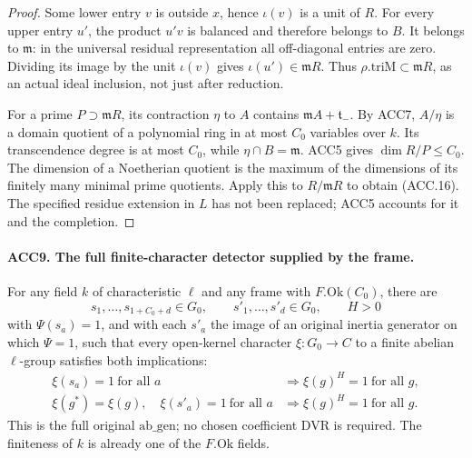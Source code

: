 \begin{proof}
Some lower entry \(v\) is outside \(x\), hence \(\iota(v)\)
is a unit of \(R\).  For every upper entry \(u'\), the product
\(u'v\) is balanced and therefore belongs to \(B\).  It belongs
to \(\mathfrak m\): in the universal residual representation
all off-diagonal entries are zero.  Dividing its image by the unit
\(\iota(v)\) gives \(\iota(u')\in\mathfrak mR\).
Thus \(\rho.\mathrm{triM}\subset\mathfrak mR\), as an actual
ideal inclusion, not just after reduction.

For a prime \(P\supset\mathfrak mR\), its contraction
\(\eta\) to \(A\) contains \(\mathfrak mA+\mathfrak t_-\).
By ACC7, \(A/\eta\) is a domain quotient of a polynomial ring
in at most \(C_0\) variables over \(k\).  Its transcendence
degree is at most \(C_0\), while \(\eta\cap B=\mathfrak m\).
ACC5 gives \(\dim R/P\le C_0\).  The dimension of a Noetherian
quotient is the maximum of the dimensions of its finitely many
minimal prime quotients.  Apply this to \(R/\mathfrak mR\)
to obtain (ACC.16).  The specified residue extension in \(L\)
has not been replaced; ACC5 accounts for it and the completion.
\end{proof}

\paragraph{ACC9. The full finite-character detector supplied by the frame.}
\label{claim:ACC9}
For any field \(k\) of characteristic \(\ell\) and any frame
with \(F.\mathrm{Ok}(C_0)\), there are
\[
 s_1,\ldots,s_{1+C_0+d}\in G_0,\qquad
 s'_1,\ldots,s'_d\in G_0,\qquad H>0                       \tag{ACC.17}
\]
with \(\Psi(s_a)=1\), and with each \(s'_a\) the image of
an original inertia generator on which \(\Psi=1\), such that
every open-kernel character \(\xi:G_0\to C\) to a finite
abelian \(\ell\)-group satisfies both implications:
\[
 \begin{split}
 \xi(s_a)=1\ \text{for all }a
       &\Longrightarrow \xi(g)^H=1\ \text{for all }g,\\
 \xi(g^*)=\xi(g),\quad \xi(s'_a)=1\ \text{for all }a
       &\Longrightarrow \xi(g)^H=1\ \text{for all }g.
 \end{split}                                                \tag{ACC.18}
\]
This is the full original \(\mathrm{ab\_gen}\); no chosen
coefficient DVR is required.  The finiteness of \(k\) is already
one of the \(F.\mathrm{Ok}\) fields.

